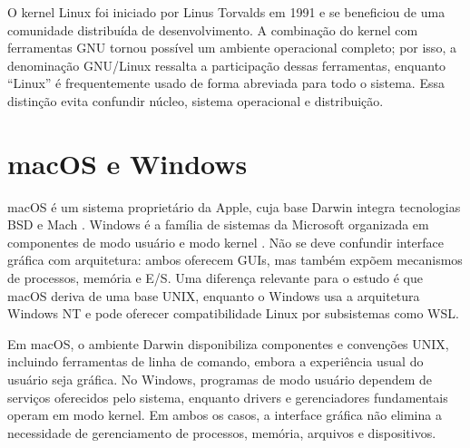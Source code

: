 \documentclass[12pt,openright,oneside,a4paper,brazil]{abntex2}
\begin{document}
O kernel Linux foi iniciado por Linus Torvalds em 1991 e se beneficiou de uma comunidade distribuída de desenvolvimento. A combinação do kernel com ferramentas GNU tornou possível um ambiente operacional completo; por isso, a denominação GNU/Linux ressalta a participação dessas ferramentas, enquanto ``Linux'' é frequentemente usado de forma abreviada para todo o sistema. Essa distinção evita confundir núcleo, sistema operacional e distribuição.

\chapter{macOS e Windows}
macOS é um sistema proprietário da Apple, cuja base Darwin integra tecnologias BSD e Mach \cite{applekernel}. Windows é a família de sistemas da Microsoft organizada em componentes de modo usuário e modo kernel \cite{windowscomponents}. Não se deve confundir interface gráfica com arquitetura: ambos oferecem GUIs, mas também expõem mecanismos de processos, memória e E/S. Uma diferença relevante para o estudo é que macOS deriva de uma base UNIX, enquanto o Windows usa a arquitetura Windows NT e pode oferecer compatibilidade Linux por subsistemas como WSL.

Em macOS, o ambiente Darwin disponibiliza componentes e convenções UNIX, incluindo ferramentas de linha de comando, embora a experiência usual do usuário seja gráfica. No Windows, programas de modo usuário dependem de serviços oferecidos pelo sistema, enquanto drivers e gerenciadores fundamentais operam em modo kernel. Em ambos os casos, a interface gráfica não elimina a necessidade de gerenciamento de processos, memória, arquivos e dispositivos.
\end{document}
